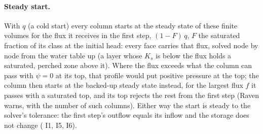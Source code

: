 \paragraph{Steady start.} With  $q$ (a cold start) every column starts at the steady
state of these finite volumes for the flux it receives in the first step, $(1-F)\,q$, $F$ the saturated fraction of its
class at the initial head: every face carries that flux, solved node by node from the water table up (a layer whose
$K_s$ is below the flux holds a saturated, perched zone above it). Where the flux exceeds what the column can pass with
$\psi=0$ at its top, that profile would put positive pressure at the top; the column then starts at the backed-up steady
state instead, for the largest flux $f$ it passes with a saturated top, and its top rejects the rest from the first step
(Raven warns, with the number of such columns). Either way the start is steady to the solver's tolerance: the first
step's outflow equals its inflow and the storage does not change ( I1, I5, I6).


